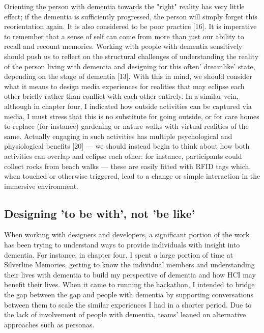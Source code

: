 Orienting the person with dementia towards the "right" reality has very little effect; if the dementia is sufficiently progressed, the person will simply forget this reorientation again. It is also considered to be poor practice [16]. It is imperative to remember that a sense of self can come from more than just our ability to recall and recount memories. Working with people with dementia sensitively should push us to reflect on the structural challenges of understanding the reality of the person living with dementia and designing for this often' dreamlike' state, depending on the stage of dementia [13]. With this in mind, we should consider what it means to design media experiences for realities that may eclipse each other briefly rather than conflict with each other entirely. In a similar vein,  although in chapter four, I indicated how outside activities can be captured via media, I must stress that this is no substitute for going outside, or for care homes to replace (for instance) gardening or nature walks with virtual realities of the same. Actually engaging in such activities has multiple psychological and physiological benefits [20] — we should instead begin to think about how both activities can overlap and eclipse each other: for instance, participants could collect rocks from beach walks — these are easily fitted with RFID tags which, when touched or otherwise triggered, lead to a change or simple interaction in the immersive environment.


\subsection{Designing 'to be with', not 'be like'}
\label{sec:considerationbeWith}
When working with designers and developers, a significant portion of the work has been trying to understand ways to provide individuals with insight into dementia. For instance, in chapter four, I spent a large portion of time at Silverline Memories, getting to know the individual members and understanding their lives with dementia to build my perspective of dementia and how HCI may benefit their lives. When it came to running the hackathon, I intended to bridge the gap between the gap and people with dementia by supporting conversations between them to scale the similar experiences I had in a shorter period. Due to the lack of involvement of people with dementia, teams' leaned on alternative approaches such as personas. 

